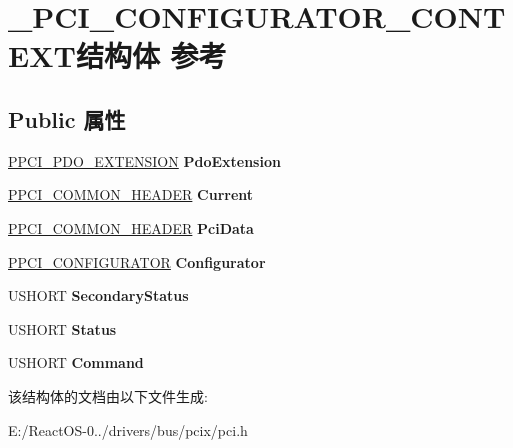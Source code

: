 \hypertarget{struct___p_c_i___c_o_n_f_i_g_u_r_a_t_o_r___c_o_n_t_e_x_t}{}\section{\+\_\+\+P\+C\+I\+\_\+\+C\+O\+N\+F\+I\+G\+U\+R\+A\+T\+O\+R\+\_\+\+C\+O\+N\+T\+E\+X\+T结构体 参考}
\label{struct___p_c_i___c_o_n_f_i_g_u_r_a_t_o_r___c_o_n_t_e_x_t}
\subsection*{Public 属性}
\begin{DoxyCompactItemize}
\item 
\mbox{\label{struct___p_c_i___c_o_n_f_i_g_u_r_a_t_o_r___c_o_n_t_e_x_t_a1e6acfa0e75cf8f75cbac6da5cfb1931}} 
\hyperlink{struct___p_c_i___p_d_o___e_x_t_e_n_s_i_o_n}{P\+P\+C\+I\+\_\+\+P\+D\+O\+\_\+\+E\+X\+T\+E\+N\+S\+I\+ON} {\bfseries Pdo\+Extension}
\item 
\mbox{\label{struct___p_c_i___c_o_n_f_i_g_u_r_a_t_o_r___c_o_n_t_e_x_t_a99f07a0c9ca1a2b7962974eb5162fd2d}} 
\hyperlink{struct___p_c_i___c_o_m_m_o_n___h_e_a_d_e_r}{P\+P\+C\+I\+\_\+\+C\+O\+M\+M\+O\+N\+\_\+\+H\+E\+A\+D\+ER} {\bfseries Current}
\item 
\mbox{\label{struct___p_c_i___c_o_n_f_i_g_u_r_a_t_o_r___c_o_n_t_e_x_t_ab06a82dda5d701094b9bb79d6093a560}} 
\hyperlink{struct___p_c_i___c_o_m_m_o_n___h_e_a_d_e_r}{P\+P\+C\+I\+\_\+\+C\+O\+M\+M\+O\+N\+\_\+\+H\+E\+A\+D\+ER} {\bfseries Pci\+Data}
\item 
\mbox{\label{struct___p_c_i___c_o_n_f_i_g_u_r_a_t_o_r___c_o_n_t_e_x_t_a0c9a70174a430520b8a6a230ba415e39}} 
\hyperlink{struct___p_c_i___c_o_n_f_i_g_u_r_a_t_o_r}{P\+P\+C\+I\+\_\+\+C\+O\+N\+F\+I\+G\+U\+R\+A\+T\+OR} {\bfseries Configurator}
\item 
\mbox{\label{struct___p_c_i___c_o_n_f_i_g_u_r_a_t_o_r___c_o_n_t_e_x_t_a4728a86f747850bea519757b1d785e0f}} 
U\+S\+H\+O\+RT {\bfseries Secondary\+Status}
\item 
\mbox{\label{struct___p_c_i___c_o_n_f_i_g_u_r_a_t_o_r___c_o_n_t_e_x_t_ac6a626e47e97824157433e71d3b25773}} 
U\+S\+H\+O\+RT {\bfseries Status}
\item 
\mbox{\label{struct___p_c_i___c_o_n_f_i_g_u_r_a_t_o_r___c_o_n_t_e_x_t_af0251ac22e2336dc6a2c368693e5a46c}} 
U\+S\+H\+O\+RT {\bfseries Command}
\end{DoxyCompactItemize}


该结构体的文档由以下文件生成\+:\begin{DoxyCompactItemize}
\item 
E\+:/\+React\+O\+S-\/0../drivers/bus/pcix/pci.\+h\end{DoxyCompactItemize}
